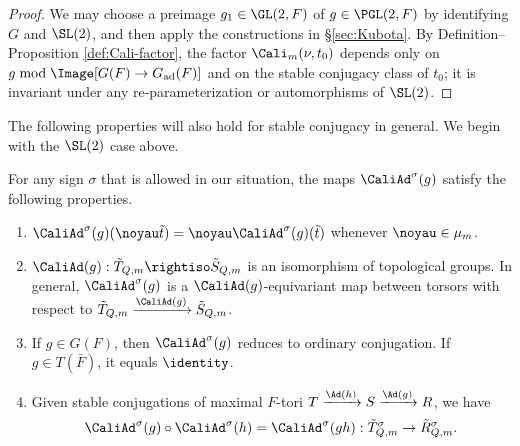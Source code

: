 \documentclass[a4paper,10pt]{article}
\begin{document}
\begin{proof}
	We may choose a preimage $g_1 \in \GL(2,F)$ of $g \in \PGL(2,F)$ by identifying $G$ and $\SL(2)$, and then apply the constructions in \S\ref{sec:Kubota}. By Definition--Proposition \ref{def:Cali-factor}, the factor $\Cali_m(\nu, t_0)$ depends only on $g \bmod \Image[G(F) \to G_\text{ad}(F)]$ and on the stable conjugacy class of $t_0$; it is invariant under any re-parameterization or automorphisms of $\SL(2)$.
\end{proof}

The following properties will also hold for stable conjugacy in general. We begin with the $\SL(2)$ case above.
\begin{proposition}\label{prop:CAd-prop}
	For any sign $\sigma$ that is allowed in our situation, the maps $\CaliAd^\sigma(g)$ satisfy the following properties.
	\begin{enumerate}[\bfseries{AD}.1.\;]
		\item $\CaliAd^\sigma(g)(\noyau\tilde{t}) = \noyau \CaliAd^\sigma(g)(\tilde{t})$ whenever $\noyau \in \mu_m$.
		\item $\CaliAd(g): \tilde{T}_{Q,m} \rightiso \tilde{S}_{Q,m}$ is an isomorphism of topological groups. In general, $\CaliAd^\sigma(g)$ is a $\CaliAd(g)$-equivariant map between torsors with respect to $\tilde{T}_{Q,m} \xrightarrow{\CaliAd(g)} \tilde{S}_{Q,m}$.
		\item If $g \in G(F)$, then $\CaliAd^\sigma(g)$ reduces to ordinary conjugation. If $g \in T(\bar{F})$, it equals $\identity$.
		\item Given stable conjugations of maximal $F$-tori $T \xrightarrow{\Ad(h)} S \xrightarrow{\Ad(g)} R$, we have
		\[ \CaliAd^\sigma(g) \circ \CaliAd^\sigma(h) = \CaliAd^\sigma(gh): \tilde{T}^\sigma_{Q,m} \to \tilde{R}^\sigma_{Q,m}. \]
	\end{enumerate}
\end{proposition}
\end{document}
